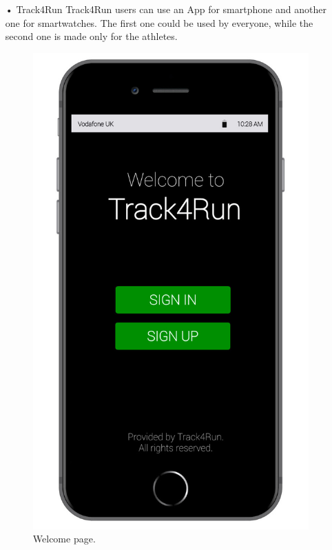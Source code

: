 \begin{enumerate}
\item[•]{\Large Track4Run}
\bigbreak
\noindent
Track4Run users can use an App for smartphone and another one for smartwatches. The first one could be used by everyone, while the second one is made only for the athletes.
\\[0.5 cm]
\begin{figure}[H]
\begin{center}
        \begin{minipage}[c]{.40\textwidth}
        \centering
          \includegraphics[height=14 cm]{Images/Mockups/Track4RunMockup1.jpg}
	\caption{Welcome page. }
        \end{minipage}%
        \hspace{10mm}%
        \begin{minipage}[c]{.40\textwidth}
        \centering

\end{minipage}
\end{center}
\end{figure}
\end{enumerate}
